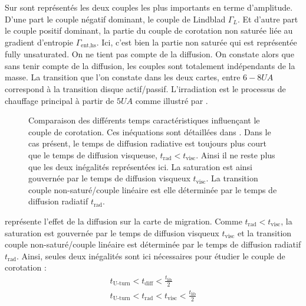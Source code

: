 Sur  sont représentés les deux couples les plus importants en terme d'amplitude. D'une part le couple négatif dominant, le
couple de Lindblad $\Gamma_L$. Et d'autre part le couple positif dominant, la partie du couple de corotation non saturée liée au gradient d'entropie
$\Gamma_\text{ent,hs}$. Ici, c'est bien la partie non saturée qui est représentée \og fully unsaturated\fg. On ne tient pas
compte de la diffusion. On constate alors que sans tenir compte de la diffusion, les couples sont totalement indépendants de la
masse. La transition que l'on constate dans les deux cartes, entre $6-8\unit{UA}$ correspond à la transition disque
actif/passif. L'irradiation est le processus de chauffage principal à partir de $5\unit{UA}$ comme illustré par
.

\begin{figure}[htb]
\centering
{}\hfill
{}

\caption{Comparaison des différents temps caractéristiques influençant le couple de corotation. Ces inéquations sont détaillées
dans . Dans le cas présent, le temps de diffusion radiative est toujours plus court que le temps
de diffusion visqueuse, $t_\text{rad}<t_\text{visc}$. Ainsi il ne reste plus que les deux inégalités représentées
ici. La saturation est ainsi gouvernée par le temps de diffusion visqueux $t_\text{visc}$. La transition couple non-saturé/couple linéaire est elle déterminée par le temps de diffusion radiatif $t_\text{rad}$.}\label{fig:timescales_maps}
\end{figure}

 représente l'effet de la diffusion sur la carte de migration. Comme $t_\text{rad}<t_\text{visc}$, la saturation est gouvernée par le temps de diffusion visqueux $t_\text{visc}$ et la transition couple non-saturé/couple linéaire est déterminée par le temps de diffusion radiatif $t_\text{rad}$. Ainsi, seules deux inégalités sont ici nécessaires pour étudier le couple de corotation :
\begin{align}
t_\text{U-turn} < t_\text{diff} < \frac{t_\text{lib}}{2}\\\nonumber
t_\text{U-turn} < t_\text{rad} < t_\text{visc} < \frac{t_\text{lib}}{2}
\end{align}

